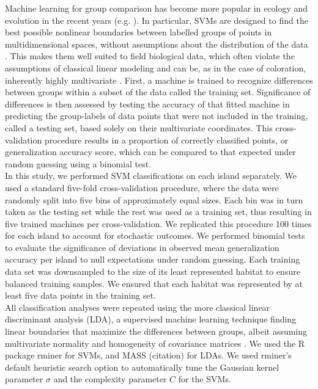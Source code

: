 Machine learning for group comparison has become more popular in ecology and evolution in the recent years (e.g. \citet{Pigot2020}). In particular, SVMs are designed to find the best possible nonlinear boundaries between labelled groups of points in multidimensional spaces, without assumptions about the distribution of the data \citep{Cortes1995, Cristianini2000, Kim2018}. This makes them well suited to field biological data, which often violate the assumptions of classical linear modeling \citep{Kim2018} and can be, as in the case of coloration, inherently highly multivariate \citep{Cuthill1999}. First, a machine is trained to recognize differences between groups within a subset of the data called the training set. Significance of differences is then assessed by testing the accuracy of that fitted machine in predicting the group-labels of data points that were not included in the training, called a testing set, based solely on their multivariate coordinates. This cross-validation procedure results in a proportion of correctly classified points, or generalization accuracy score, which can be compared to that expected under random guessing using a binomial test.\\

In this study, we performed SVM classifications on each island separately. We used a standard five-fold cross-validation procedure, where the data were randomly split into five bins of approximately equal sizes. Each bin was in turn taken as the testing set while the rest was used as a training set, thus resulting in five trained machines per cross-validation. We replicated this procedure 100 times for each island to account for stochastic outcomes. We performed binomial tests to evaluate the significance of deviations in observed mean generalization accuracy per island to null expectations under random guessing. Each training data set was downsampled to the size of its least represented habitat to ensure balanced training samples. We ensured that each habitat was represented by at least five data points in the training set.\\ 

All classification analyses were repeated using the more classical linear discriminant analysis (LDA), a supervised machine learning technique finding linear boundaries that maximize the differences between groups, albeit assuming multivariate normality and homogeneity of covariance matrices \citep{Ripley1996a}. We used the R package rminer \citep{Cortez2010, Cortez2016} for SVMs, and MASS (citation) for LDAs. We used rminer's default heuristic search option to automatically tune the Gaussian kernel parameter $\sigma$ and the complexity parameter $C$ for the SVMs.\\


